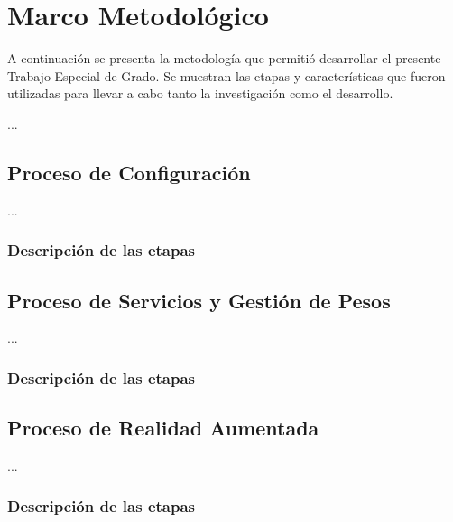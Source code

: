 \chapter{Marco Metodol\'ogico}
\label{chap:marcometodologico}

A continuaci\'on se presenta la metodolog\'ia que permiti\'o desarrollar el presente Trabajo Especial de Grado. Se muestran  las etapas y caracter\'isticas que fueron utilizadas para llevar a cabo tanto la investigaci\'on como el desarrollo.

...


\section{Proceso de Configuraci\'on}

...


\subsection{Descripci\'on de las etapas}



\section{Proceso de Servicios y Gesti\'on de Pesos}

...

\subsection{Descripci\'on de las etapas}


\section{Proceso de Realidad Aumentada}

...

\subsection{Descripci\'on de las etapas}


\newpage